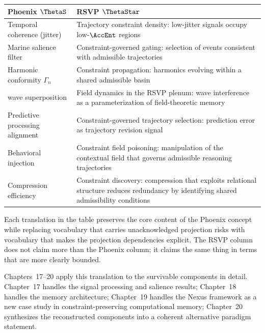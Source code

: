 \begin{center}
\begin{tabular}{p{}p{}}
\toprule
Phoenix $\ThetaS$ & RSVP $\ThetaStar$ \\
\midrule
Temporal coherence (jitter) & Trajectory constraint density:
low-jitter signals occupy low-$\AccEnt$ regions \\[6pt]
Marine salience filter & Constraint-governed gating: selection
of events consistent with admissible trajectories \\[6pt]
Harmonic conformity $\Gamma_n$ & Constraint propagation: harmonics
evolving within a shared admissible basin \\[6pt]
\MEMeight{} wave superposition & Field dynamics in the RSVP plenum:
wave interference as a parameterization of field-theoretic
memory \\[6pt]
Predictive processing alignment & Constraint-governed trajectory
selection: prediction error as trajectory revision signal \\[6pt]
Behavioral injection & Constraint field poisoning: manipulation
of the contextual field that governs admissible reasoning
trajectories \\[6pt]
Compression efficiency & Constraint discovery: compression that
exploits relational structure reduces redundancy by identifying
shared admissibility conditions \\
\bottomrule
\end{tabular}
\end{center}

\medskip

Each translation in the table preserves the core content
of the Phoenix concept while replacing vocabulary that
carries unacknowledged projection risks with vocabulary
that makes the projection dependencies explicit. The
RSVP column does not claim more than the Phoenix column;
it claims the same thing in terms that are more clearly
bounded.

\medskip

Chapters~17--20 apply this translation to the survivable
components in detail. Chapter~17 handles the signal
processing and salience results; Chapter~18 handles
the memory architecture; Chapter~19 handles the Nexus
framework as a new case study in constraint-preserving
computational memory; Chapter~20 synthesizes the
reconstructed components into a coherent alternative
paradigm statement.
